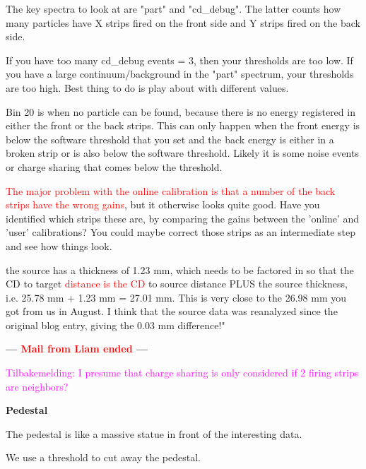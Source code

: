 \documentclass[twoside,english]{uiofysmaster/uiofysmaster}
\begin{document}
The key spectra to look at are "part" and "cd\_debug". The latter counts how many particles have X strips fired on the front side and Y strips fired on the back side.

If you have too many cd\_debug events = 3, then your thresholds are too low. If you have a large continuum/background in the "part" spectrum, your thresholds are too high. Best thing to do is play about with different values.

Bin 20 is when no particle can be found, because there is no energy registered in either the front or the back strips. This can only happen when the front energy is below the software threshold that you set and the back energy is either in a broken strip or is also below the software threshold. Likely it is some noise events or charge sharing that comes below the threshold.

\textcolor{red}{The major problem with the online calibration is that a number of the back strips have the wrong gains}, but it otherwise looks quite good. Have you identified which strips these are, by comparing the gains between the 'online' and 'user' calibrations? You could maybe correct those strips as an intermediate step and see how things look.

the source has a thickness of 1.23 mm, which needs to be factored in so that the CD to target \textcolor{red}{distance is the CD} to source distance PLUS the source thickness, i.e. 25.78 mm + 1.23 mm =  27.01 mm. This is very close to the 26.98 mm you got from us in August. I think that the source data was reanalyzed since the original blog entry, giving the 0.03 mm difference!"

\textbf{--- \textcolor{red}{Mail from Liam ended} ---}

\textcolor{Magenta}{Tilbakemelding: \newline 
I presume that charge sharing is only considered if 2 firing strips are neighbors?
}

\textbf{Pedestal}

The pedestal is like a massive statue in front of the interesting data. 


We use a threshold to cut away the pedestal.
\end{document}
